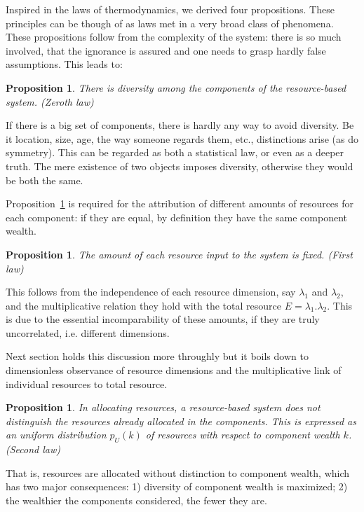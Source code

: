 \documentclass[a4paper, 11pt]{article} %
\newtheorem{proposition}[theorem]{Proposition}
\begin{document}
Inspired in the laws of thermodynamics, we derived four
propositions.
These principles can be though of as laws met in
a very broad class of phenomena.
These propositions follow from the complexity of the system:
there is so much involved, that the ignorance is assured and
one needs to grasp hardly false assumptions. 
This leads to:


\begin{proposition}\label{prop:0}
	There is diversity among the components of the resource-based system. (Zeroth law)
\end{proposition}

If there is a big set of components, there is hardly any way to avoid diversity. Be it location, size, age, the way someone regards them, etc., distinctions arise (as do symmetry). This can be regarded as both a statistical law, or even as a deeper truth.
The mere existence of two objects imposes diversity,
otherwise they would be both the same.

Proposition~\ref{prop:0} is required for the attribution of different amounts of resources for each component:
if they are equal, by definition they have the same component wealth.

\begin{proposition}\label{prop:1}
	The amount of each resource input to the system is fixed. (First law)
\end{proposition}

This follows from the independence of each resource dimension,
say $\lambda_1$ and $\lambda_2$, and
the multiplicative relation they hold with the total resource $E=\lambda_1 . \lambda_2$.
This is due to the essential incomparability of these amounts, if they are truly uncorrelated, i.e. different dimensions.

Next section holds this discussion more throughly
but it
boils down to dimensionless observance of resource
dimensions and the multiplicative link of individual resources
to total resource. 

\begin{proposition}\label{prop:2}
	In allocating resources, a resource-based system does not distinguish the resources already allocated in the components. This is expressed as an uniform distribution $p_U(k)$ of resources with respect to component wealth $k$. (Second law)
\end{proposition}

That is, resources are allocated without distinction to component wealth, which has two major consequences: 1) diversity of component wealth is maximized; 2) the wealthier the components considered, the fewer they are. 
\end{document}
